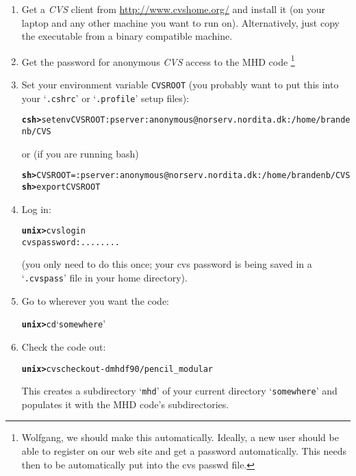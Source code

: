 \documentclass[12pt,twoside,notitlepage,a4paper]{article}
\makeatletter
\newcommand{\prompt}[1]{{\ttfamily\bfseries{}#1}}
\newcommand{\code}[1]{\texttt{#1}}
\newcommand{\env}[1]{\code{#1}\index{#1@\emph{#1}}}
\newcommand{\file}[1]{`\texttt{#1}'}
\newcommand{\name}[1]{\textsl{#1}\index{#1}\/}
\makeatother
\begin{document}
\begin{enumerate}

\item Get a \name{CVS} client from \url{http://www.cvshome.org/} and
  install it (on your laptop and any other machine you want to run on).
  Alternatively, just copy the executable from a binary compatible
  machine.

\item Get the password for anonymous \name{CVS} access to the MHD code
\footnote{Wolfgang, we should make this automatically. Ideally, a new user
should be able to register on our web site and get a password automatically.
This needs then to be automatically put into the cvs passwd file.}

\item Set your environment variable \env{CVSROOT} (you probably want to
  put this into your \file{.cshrc} or \file{.profile} setup files):
  \begin{alltt}
  \prompt{csh> } setenv CVSROOT :pserver:anonymous@norserv.nordita.dk:/home/brandenb/CVS \
  \end{alltt}
  or (if you are running bash)
  \begin{alltt}
  \prompt{sh> } CVSROOT=:pserver:anonymous@norserv.nordita.dk:/home/brandenb/CVS
  \prompt{sh> } export CVSROOT \
  \end{alltt}

\item Log in:
  \begin{alltt}
  \prompt{unix> } cvs login
  cvs password: ........ \
\end{alltt}
(you only need to do this once; your cvs password is being saved in
a \file{.cvspass} file in your home directory).

\item Go to wherever you want the code:
  \begin{alltt}
  \prompt{unix> } cd \file{somewhere} \
  \end{alltt}

\item Check the code out:
  \begin{alltt}
  \prompt{unix> } cvs checkout -d mhd f90/pencil_modular \
  \end{alltt} 
  This creates a subdirectory \file{mhd} of your current directory
  \file{somewhere} and populates it with the MHD code's subdirectories.

\end{enumerate}
\end{document}
